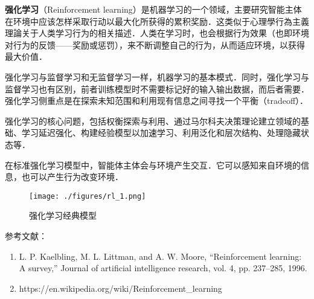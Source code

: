 
\textbf{强化学习}（Reinforcement learning）是机器学习的一个领域，主要研究智能主体在环境中应该怎样采取行动以最大化所获得的累积奖励．这类似于心理學行為主義理論关于人类学习行为的相关描述．人类在学习时，也会根据行为效果（也即环境对行为的反馈——奖励或惩罚），来不断调整自己的行为，从而适应环境，以获得最大价值．

强化学习与监督学习和无监督学习一样，机器学习的基本模式．同时，强化学习与监督学习也有区别，前者训练模型时不需要标记好的输入输出数据，而后者需要．强化学习侧重点是在探索未知范围和利用现有信息之间寻找一个平衡（tradeoff）．

强化学习的核心问题，包括权衡探索与利用、通过马尔科夫决策理论建立领域的基础、学习延迟强化、构建经验模型以加速学习、利用泛化和层次结构、处理隐藏状态等．

在标准强化学习模型中，智能体主体会与环境产生交互．它可以感知来自环境的信息，也可以产生行为改变环境．

\begin{figure}[ht]
\centering
\texttt{[image: ./figures/rl\_1.png]}
\caption{强化学习经典模型} \label{rl_fig1}
\end{figure}


参考文献：
\begin{enumerate}
\item L. P. Kaelbling, M. L. Littman, and A. W. Moore, “Reinforcement learning: A survey,” Journal of artificial intelligence research, vol. 4, pp. 237–285, 1996.
\item https://en.wikipedia.org/wiki/Reinforcement_learning
\end{enumerate}